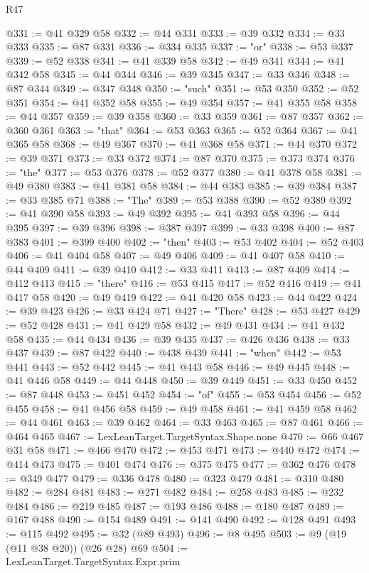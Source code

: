 \begin{lexlean}{R47}
\begin{coremodule}
@331 := @41 @329 @58
@332 := @44 @331
@333 := @39 @332
@334 := @33 @333
@335 := @87 @331
@336 := @334 @335
@337 := "or"
@338 := @53 @337
@339 := @52 @338
@341 := @41 @339 @58
@342 := @49 @341
@344 := @41 @342 @58
@345 := @44 @344
@346 := @39 @345
@347 := @33 @346
@348 := @87 @344
@349 := @347 @348
@350 := "such"
@351 := @53 @350
@352 := @52 @351
@354 := @41 @352 @58
@355 := @49 @354
@357 := @41 @355 @58
@358 := @44 @357
@359 := @39 @358
@360 := @33 @359
@361 := @87 @357
@362 := @360 @361
@363 := "that"
@364 := @53 @363
@365 := @52 @364
@367 := @41 @365 @58
@368 := @49 @367
@370 := @41 @368 @58
@371 := @44 @370
@372 := @39 @371
@373 := @33 @372
@374 := @87 @370
@375 := @373 @374
@376 := "the"
@377 := @53 @376
@378 := @52 @377
@380 := @41 @378 @58
@381 := @49 @380
@383 := @41 @381 @58
@384 := @44 @383
@385 := @39 @384
@387 := @33 @385 @71
@388 := "The"
@389 := @53 @388
@390 := @52 @389
@392 := @41 @390 @58
@393 := @49 @392
@395 := @41 @393 @58
@396 := @44 @395
@397 := @39 @396
@398 := @387 @397
@399 := @33 @398
@400 := @87 @383
@401 := @399 @400
@402 := "then"
@403 := @53 @402
@404 := @52 @403
@406 := @41 @404 @58
@407 := @49 @406
@409 := @41 @407 @58
@410 := @44 @409
@411 := @39 @410
@412 := @33 @411
@413 := @87 @409
@414 := @412 @413
@415 := "there"
@416 := @53 @415
@417 := @52 @416
@419 := @41 @417 @58
@420 := @49 @419
@422 := @41 @420 @58
@423 := @44 @422
@424 := @39 @423
@426 := @33 @424 @71
@427 := "There"
@428 := @53 @427
@429 := @52 @428
@431 := @41 @429 @58
@432 := @49 @431
@434 := @41 @432 @58
@435 := @44 @434
@436 := @39 @435
@437 := @426 @436
@438 := @33 @437
@439 := @87 @422
@440 := @438 @439
@441 := "when"
@442 := @53 @441
@443 := @52 @442
@445 := @41 @443 @58
@446 := @49 @445
@448 := @41 @446 @58
@449 := @44 @448
@450 := @39 @449
@451 := @33 @450
@452 := @87 @448
@453 := @451 @452
@454 := "of"
@455 := @53 @454
@456 := @52 @455
@458 := @41 @456 @58
@459 := @49 @458
@461 := @41 @459 @58
@462 := @44 @461
@463 := @39 @462
@464 := @33 @463
@465 := @87 @461
@466 := @464 @465
@467 := LexLeanTarget.TargetSyntax.Shape.none
@470 := @66 @467 @31 @58
@471 := @466 @470
@472 := @453 @471
@473 := @440 @472
@474 := @414 @473
@475 := @401 @474
@476 := @375 @475
@477 := @362 @476
@478 := @349 @477
@479 := @336 @478
@480 := @323 @479
@481 := @310 @480
@482 := @284 @481
@483 := @271 @482
@484 := @258 @483
@485 := @232 @484
@486 := @219 @485
@487 := @193 @486
@488 := @180 @487
@489 := @167 @488
@490 := @154 @489
@491 := @141 @490
@492 := @128 @491
@493 := @115 @492
@495 := @32 (@89 @493)
@496 := @8 @495
@503 := @9 (@19 (@11 @38 @20)) (@26 @28) @69
@504 := LexLeanTarget.TargetSyntax.Expr.prim

\end{coremodule}
\end{lexlean}

